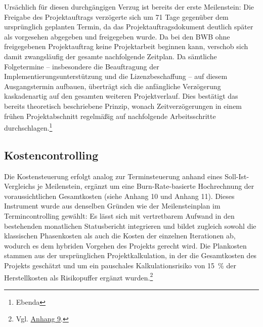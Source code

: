 \documentclass[
    12pt, 
    a4paper,
    ]{scrartcl} %
\begin{document}
Ursächlich für diesen durchgängigen Verzug ist bereits der erste Meilenstein: Die Freigabe des Projektauftrags verzögerte sich um 71 Tage gegenüber dem ursprünglich geplanten Termin, da das Projektauftragsdokument deutlich später als vorgesehen abgegeben und freigegeben wurde. Da bei den BWB ohne freigegebenen Projektauftrag keine Projektarbeit beginnen kann, verschob sich damit zwangsläufig der gesamte nachfolgende Zeitplan. Da sämtliche Folgetermine -- insbesondere die Beauftragung der Implementierungsunterstützung und die Lizenzbeschaffung -- auf diesem Ausgangstermin aufbauen, überträgt sich die anfängliche Verzögerung kaskadenartig auf den gesamten weiteren Projektverlauf. Dies bestätigt das bereits theoretisch beschriebene Prinzip, wonach Zeitverzögerungen in einem frühen Projektabschnitt regelmäßig auf nachfolgende Arbeitsschritte durchschlagen.\footnote{Ebenda}

\subsection{Kostencontrolling}

Die Kostensteuerung erfolgt analog zur Terminsteuerung anhand eines Soll-Ist-Vergleichs je Meilenstein, ergänzt um eine Burn-Rate-basierte Hochrechnung der voraussichtlichen Gesamtkosten (siehe Anhang 10 und Anhang 11). Dieses Instrument wurde aus denselben Gründen wie der Meilensteinplan im Termincontrolling gewählt: Es lässt sich mit vertretbarem Aufwand in den bestehenden monatlichen Statusbericht integrieren und bildet zugleich sowohl die klassischen Phasenkosten als auch die Kosten der einzelnen Iterationen ab, wodurch es dem hybriden Vorgehen des Projekts gerecht wird. Die Plankosten stammen aus der ursprünglichen Projektkalkulation, in der die Gesamtkosten des Projekts geschätzt und um ein pauschales Kalkulationsrisiko von 15~\% der Herstellkosten als Risikopuffer ergänzt wurden.\footnote{Vgl. \hyperref[sec:Anhang9]{Anhang 9}.}
\end{document}
